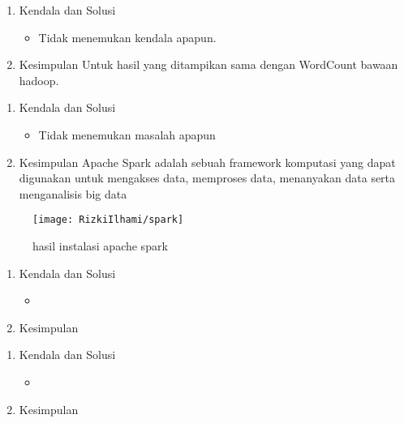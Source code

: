 \begin{enumerate}
\item Kendala dan Solusi

\begin{itemize}
\item Tidak menemukan kendala apapun.
\end{itemize}

\item Kesimpulan
\newline
    Untuk hasil yang ditampikan sama dengan WordCount bawaan hadoop.

\end{enumerate}

\begin{enumerate}
\item Kendala dan Solusi

\begin{itemize}
\item Tidak menemukan masalah apapun
\end{itemize}


\item Kesimpulan
\newline
    Apache Spark adalah sebuah framework komputasi
    yang dapat digunakan untuk mengakses data, memproses
    data, menanyakan data serta menganalisis big data

\end{enumerate}

\begin{figure}[!ht]
\texttt{[image: RizkiIlhami/spark]}
\caption{hasil instalasi apache spark }
\label{gam:hasil instalasi spark}
\end{figure}

\begin{enumerate}
\item Kendala dan Solusi

\begin{itemize}
\item 
\end{itemize}


\item Kesimpulan

\end{enumerate}

\begin{enumerate}
\item Kendala dan Solusi

\begin{itemize}
\item
\end{itemize}


\item Kesimpulan

\end{enumerate}

